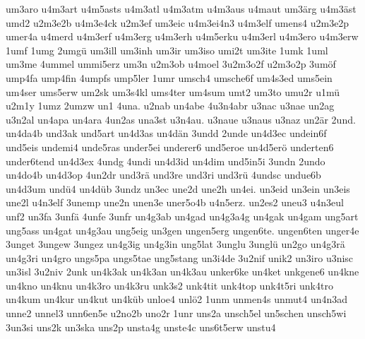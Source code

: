{    um3aro
    u4m3art
    u4m5asts
    u4m3atl
    u4m3atm
    u4m3aus
    u4maut
    um3ärg
    u4m3äst
    umd2
    u2m3e2b
    u4m3e4ck
    u2m3ef
    um3eic
    u4m3ei4n3
    u4m3elf
    umens4
    u2m3e2p
    umer4a
    u4merd
    u4m3erf
    u4m3erg
    u4m3erh
    u4m5erku
    u4m3erl
    u4m3ero
    u4m3erw
    1umf
    1umg
    2umgü
    um3ill
    um3inh
    um3ir
    um3iso
    umi2t
    um3ite
    1umk
    1uml
    um3me
    4ummel
    ummi5erz
    um3n
    u2m3ob
    u4moel
    3u2m3o2f
    u2m3o2p
    3umöf
    ump4fa
    ump4fin
    4umpfs
    ump5ler
    1umr
    umsch4
    umsche6f
    um4s3ed
    ums5ein
    um4ser
    ums5erw
    um2sk
    um3s4kl
    ums4ter
    um4sum
    umt2
    um3to
    umu2r
    u1mü
    u2m1y
    1umz
    2umzw
    un1
    4una.
    u2nab
    un4abe
    4u3n4abr
    u3nac
    u3nae
    un2ag
    u3n2al
    un4apa
    un4ara
    4un2as
    una3st
    u3n4au.
    u3naue
    u3naus
    u3naz
    un2är
    2und.
    un4da4b
    und3ak
    und5art
    un4d3as
    un4dän
    3undd
    2unde
    un4d3ec
    undein6f
    und5eis
    undemi4
    unde5ras
    under5ei
    underer6
    und5eroe
    un4d5erö
    underten6
    under6tend
    un4d3ex
    4undg
    4undi
    un4d3id
    un4dim
    und5in5i
    3undn
    2undo
    un4do4b
    un4d3op
    4un2dr
    und3rä
    und3re
    und3ri
    und3rü
    4undsc
    undue6b
    un4d3um
    undü4
    un4düb
    3undz
    un3ec
    une2d
    une2h
    un4ei.
    un3eid
    un3ein
    un3eis
    une2l
    u4n3elf
    3unemp
    une2n
    unen3e
    uner5o4b
    u4n5erz.
    un2es2
    uneu3
    u4n3eul
    unf2
    un3fa
    3unfä
    4unfe
    3unfr
    un4g3ab
    un4gad
    un4g3a4g
    un4gak
    un4gam
    ung5art
    ung5ass
    un4gat
    un4g3au
    ung5eig
    un3gen
    ungen5erg
    ungen6te.
    ungen6ten
    unger4e
    3unget
    3ungew
    3ungez
    un4g3ig
    un4g3in
    ung5lat
    3unglu
    3unglü
    un2go
    un4g3rä
    un4g3ri
    un4gro
    ungs5pa
    ungs5tae
    ung5stang
    un3i4de
    3u2nif
    unik2
    un3iro
    u3nisc
    un3isl
    3u2niv
    2unk
    un4k3ak
    un4k3an
    un4k3au
    unker6ke
    un4ket
    unkgene6
    un4kne
    un4kno
    un4knu
    un4k3ro
    un4k3ru
    unk3s2
    unk4tit
    unk4top
    unk4t5ri
    unk4tro
    un4kum
    un4kur
    un4kut
    un4küb
    unloe4
    unlö2
    1unm
    unmen4s
    unmut4
    un4n3ad
    unne2
    unnel3
    unn6en5e
    u2no2b
    uno2r
    1unr
    uns2a
    unsch5el
    un5schen
    unsch5wi
    3un3si
    uns2k
    un3ska
    uns2p
    unsta4g
    unste4c
    uns6t5erw
    unstu4
}

